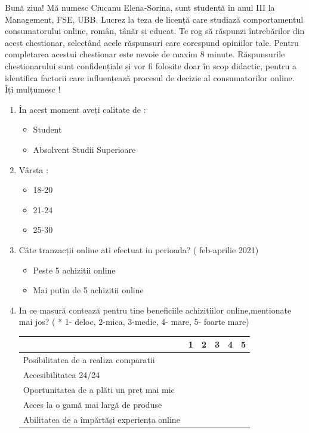 \documentclass[a4paper, 12pt]{article}
\begin{document}
	\quad Bună ziua! Mă numesc Ciucanu Elena-Sorina, sunt studentă în anul III la Management, FSE, UBB. Lucrez la teza de licență care studiază comportamentul consumatorului online, român, tânăr și educat. Te rog să răspunzi întrebărilor din acest chestionar, selectând acele răspunsuri care corespund opiniilor tale. Pentru completarea acestui chestionar este nevoie de maxim 8 minute. Răspunsurile chestionarului sunt confidențiale și vor fi folosite doar în scop didactic, pentru a identifica factorii care influențează procesul de decizie al consumatorilor online. Îți mulțumesc !
\newline
\begin{enumerate}
	\item În acest moment aveți calitate de :
\begin{itemize}
		\item Student
		\item Absolvent Studii Superioare
\end{itemize}
	 	\item Vârsta : 
\begin{itemize}
		\item 18-20
		\item 21-24
		\item 25-30
\end{itemize}		
	\item Câte tranzacții online ati efectuat in perioada? ( feb-aprilie 2021) 
	
	\begin{itemize}
		\item Peste 5 achizitii online
		\item Mai putin de 5 achizitii online
	\end{itemize}
\thispagestyle{empty}
	\item	In ce masură contează pentru tine beneficiile achizitiilor online,mentionate mai jos? ( * 1- deloc, 2-mica, 3-medie, 4- mare,  5- foarte mare)
\begin{center}
	\begin{tabular}{ | m{19em} | m{1cm}| m{1cm} | m{1cm}| m{1cm} | m{1cm} |} 
		\hline
		 & 1 & 2 & 3 & 4 & 5\\ 
		\hline
		Posibilitatea de a realiza comparatii  &  &  &  & & \\ 
		\hline
		Accesibilitatea 
		24/24  &  &   &  &  &\\ 
		\hline
		Oportunitatea de a plăti un preț mai mic &  &   &  & & \\ 
		\hline
		Acces la o gamă mai largă de produse &  &  &  & & \\ 
		\hline
		Abilitatea de a împărtăși experiența online &  &  &  & & \\
		\hline
	\end{tabular}
\newline
\end{center}


\end{enumerate}
\end{document}
